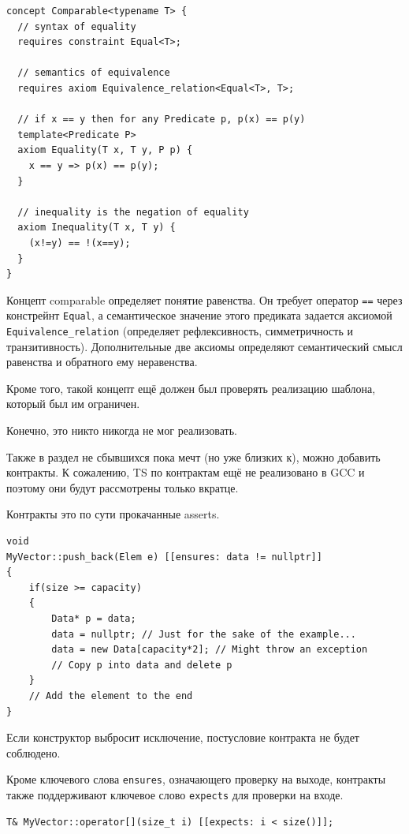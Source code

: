 \documentclass[a4paper,12pt,oneside]{book}
\begin{document}
\begin{lstlisting}
concept Comparable<typename T> {
  // syntax of equality
  requires constraint Equal<T>; 

  // semantics of equivalence
  requires axiom Equivalence_relation<Equal<T>, T>; 

  // if x == y then for any Predicate p, p(x) == p(y)
  template<Predicate P>
  axiom Equality(T x, T y, P p) {
    x == y => p(x) == p(y); 
  }

  // inequality is the negation of equality
  axiom Inequality(T x, T y) {
    (x!=y) == !(x==y); 
  }
}
\end{lstlisting}

Концепт comparable определяет понятие равенства. Он требует оператор \lstinline!==! через констрейнт \lstinline!Equal!, а семантическое значение этого предиката задается аксиомой \lstinline!Equivalence_relation! (определяет рефлексивность, симметричность и транзитивность). Дополнительные две аксиомы определяют семантический смысл равенства и обратного ему неравенства.

Кроме того, такой концепт ещё должен был проверять реализацию шаблона, который был им ограничен.

Конечно, это никто никогда не мог реализовать.

Также в раздел не сбывшихся пока мечт (но уже близких к), можно добавить контракты. К сожалению, TS по контрактам ещё не реализовано в GCC и поэтому они будут рассмотрены только вкратце.

Контракты это по сути прокачанные asserts.

\begin{lstlisting}
void 
MyVector::push_back(Elem e) [[ensures: data != nullptr]]
{
    if(size >= capacity)
    {
        Data* p = data;
        data = nullptr; // Just for the sake of the example...
        data = new Data[capacity*2]; // Might throw an exception
        // Copy p into data and delete p
    }
    // Add the element to the end
}
\end{lstlisting}

Если конструктор выбросит исключение, постусловие контракта не будет соблюдено.

Кроме ключевого слова \lstinline!ensures!, означающего проверку на выходе, контракты также поддерживают ключевое слово \lstinline!expects! для проверки на входе.

\begin{lstlisting}
T& MyVector::operator[](size_t i) [[expects: i < size()]];
\end{lstlisting}
\end{document}
